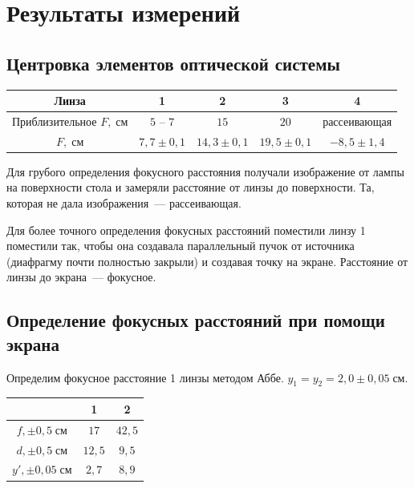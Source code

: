 \section{Результаты измерений}
\subsection{Центровка элементов оптической системы}
\begin{tabular}{|c|c|c|c|c|}
\hline
    Линза & 1 & 2 & 3 & 4 \\\hline
    Приблизительное $F,\;\text{см}$ & $5$ -- $7$ & $15$ & $20$ & рассеивающая \\\hline
    $F,\;\text{см}$ & $7{,}7 \pm 0{,}1$ & $14{,}3 \pm 0{,}1$ & $19{,}5 \pm 0{,}1$ & $-8{,}5 \pm 1{,}4$ \\\hline
\end{tabular}

Для грубого определения фокусного расстояния получали изображение от лампы на поверхности стола и замеряли расстояние от линзы до поверхности. Та, которая не дала изображения~--- рассеивающая.

Для более точного определения фокусных расстояний поместили линзу 1 поместили так, чтобы она создавала параллельный пучок от источника (диафрагму почти полностью закрыли) и создавая точку на экране. Расстояние от линзы до экрана~--- фокусное.

\subsection{Определение фокусных расстояний при помощи экрана}
\begin{figure}[ht!]
\end{figure}
Определим фокусное расстояние 1 линзы методом Аббе. $y_{1} = y_{2} = 2{,}0\pm 0{,}05\;\text{см}$.

\begin{tabular}{|c|c|c|}
\hline
     & 1 & 2 \\\hline
    $f,\pm 0{,}5\;\text{см}$ & $17$ & $42{,}5$ \\\hline
    $d,\pm 0{,}5\;\text{см}$  & $12{,}5$ & $9{,}5$ \\\hline
    $y',\pm 0{,}05\;\text{см}$ & $2{,}7$ & $8{,}9$ \\\hline
\end{tabular}

